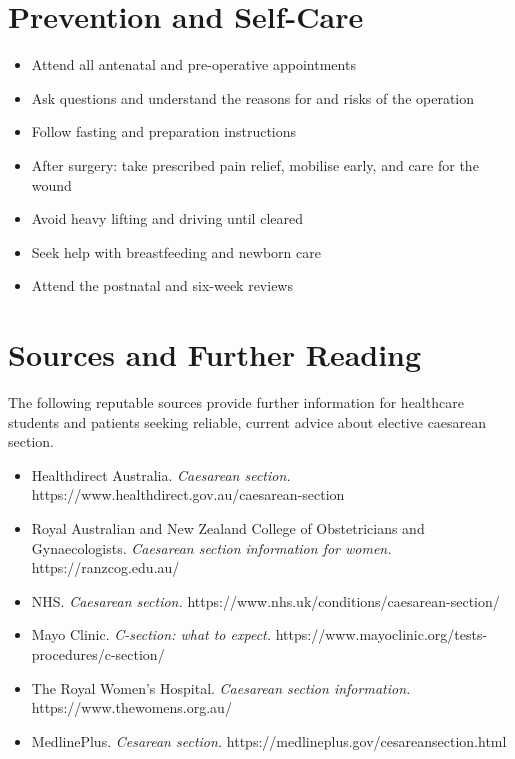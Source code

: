 \section*{Prevention and Self-Care}
\begin{itemize}
    \item Attend all antenatal and pre-operative appointments
    \item Ask questions and understand the reasons for and risks of the operation
    \item Follow fasting and preparation instructions
    \item After surgery: take prescribed pain relief, mobilise early, and care for the wound
    \item Avoid heavy lifting and driving until cleared
    \item Seek help with breastfeeding and newborn care
    \item Attend the postnatal and six-week reviews
\end{itemize}

\section*{Sources and Further Reading}
The following reputable sources provide further information for healthcare students and patients seeking reliable, current advice about elective caesarean section.
\begin{itemize}
    \item Healthdirect Australia. \textit{Caesarean section.} https://www.healthdirect.gov.au/caesarean-section
    \item Royal Australian and New Zealand College of Obstetricians and Gynaecologists. \textit{Caesarean section information for women.} https://ranzcog.edu.au/
    \item NHS. \textit{Caesarean section.} https://www.nhs.uk/conditions/caesarean-section/
    \item Mayo Clinic. \textit{C-section: what to expect.} https://www.mayoclinic.org/tests-procedures/c-section/
    \item The Royal Women's Hospital. \textit{Caesarean section information.} https://www.thewomens.org.au/
    \item MedlinePlus. \textit{Cesarean section.} https://medlineplus.gov/cesareansection.html
\end{itemize}
